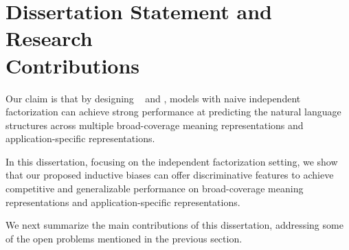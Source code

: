 \section[Dissertation Statement and Research
Contributions]{Dissertation Statement and Research \\Contributions}

\label{sec:intro-contri}

Our claim is that by designing ~ and
, models with naive
independent factorization can achieve strong performance at predicting
the natural language structures across multiple broad-coverage meaning
representations and application-specific representations.

In this dissertation, focusing on the independent factorization
setting, we show that our proposed inductive biases can offer
discriminative features to achieve competitive and generalizable
performance on broad-coverage meaning representations and
application-specific representations.

We next summarize the main contributions of this dissertation, addressing
some of the open problems mentioned in the previous section.

